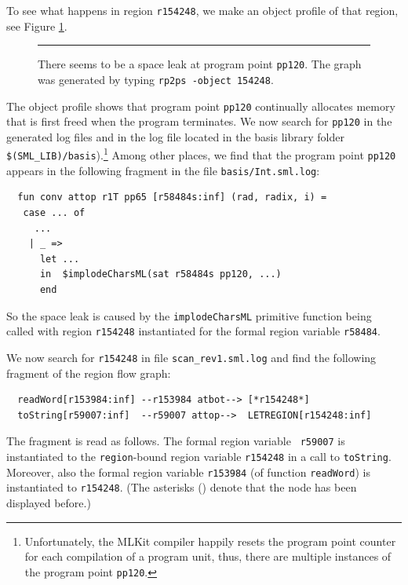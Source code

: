 \documentclass[12pt]{book}
\begin{document}
To see what happens in region \texttt{r154248}, we make an object profile of
that region, see Figure \ref{scan_rev1_2.fig}.
\begin{figure}
\caption{There seems to be a space leak at program point
  \texttt{pp120}. The graph was generated by typing \texttt{rp2ps
    -object 154248}.}
\label{scan_rev1_2.fig}
\medskip\hrule
\end{figure}
The object profile shows that program point \texttt{pp120} continually
allocates memory that is first freed when the program terminates. We
now search for \texttt{pp120} in the generated log files and in the
log file located in the basis library folder
\texttt{\$(SML\_LIB)/basis}).\footnote{Unfortunately, the MLKit
  compiler happily resets the program point counter for each
  compilation of a program unit, thus, there are multiple instances of
  the program point \texttt{pp120}.} Among other places, we find that
the program point \texttt{pp120} appears in the following fragment in
the file \texttt{basis/Int.sml.log}:
\begin{verbatim}
  fun conv attop r1T pp65 [r58484s:inf] (rad, radix, i) =
   case ... of
     ...
    | _ =>
      let ...
      in  $implodeCharsML(sat r58484s pp120, ...)
      end
\end{verbatim}
So the space leak is caused by the {\tt implodeCharsML} primitive
function being called with region {\tt r154248} instantiated for the
formal region variable {\tt r58484}.

We now search for \texttt{r154248} in file \texttt{scan\_rev1.sml.log}
and find the following fragment of the region flow graph:
\begin{small}
\begin{verbatim}
  readWord[r153984:inf] --r153984 atbot--> [*r154248*]
  toString[r59007:inf]  --r59007 attop-->  LETREGION[r154248:inf]
\end{verbatim}
\end{small}
The fragment is read as follows. The formal region variable {\tt
  r59007} is instantiated to the {\tt region}-bound region variable
{\tt r154248} in a call to {\tt toString}. Moreover, also the formal
region variable {\tt r153984} (of function {\tt readWord}) is
instantiated to {\tt r154248}. (The asterisks ({\tt *}) denote that the
node has been displayed before.)
\end{document}
